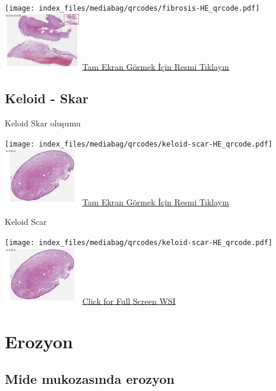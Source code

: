 \documentclass[
  letterpaper,
  DIV=11,
  numbers=noendperiod]{scrreprt}
\begin{document}
\texttt{[image: index\_files/mediabag/qrcodes/fibrosis-HE\_qrcode.pdf]}
\href{https://images.patolojiatlasi.com/fibrosis/HE.html}{\includegraphics[width=0.25\textwidth,height=\textheight]{./screenshots/thumbnail_fibrosis.png}}
\href{https://images.patolojiatlasi.com/fibrosis/HE.html}{Tam Ekran
Görmek İçin Resmi Tıklayın}

\section{Keloid - Skar}\label{sec-keloid-skar}

Keloid Skar oluşumu

\texttt{[image: index\_files/mediabag/qrcodes/keloid-scar-HE\_qrcode.pdf]}
\href{https://images.patolojiatlasi.com/keloid-scar/HE.html}{\includegraphics[width=0.25\textwidth,height=\textheight]{./screenshots/thumbnail_keloid-scar.png}}
\href{https://images.patolojiatlasi.com/keloid-scar/HE.html}{Tam Ekran
Görmek İçin Resmi Tıklayın}

Keloid Scar

\texttt{[image: index\_files/mediabag/qrcodes/keloid-scar-HE\_qrcode.pdf]}
\href{https://images.patolojiatlasi.com/keloid-scar/HE.html}{\includegraphics[width=0.25\textwidth,height=\textheight]{./screenshots/thumbnail_keloid-scar.png}}
\href{https://images.patolojiatlasi.com/keloid-scar/HE.html}{Click for
Full Screen WSI}

\chapter{Erozyon}\label{sec-erozyon}

\section{Mide mukozasında erozyon}\label{sec-mide-mukozasinda-erozyon}
\end{document}
